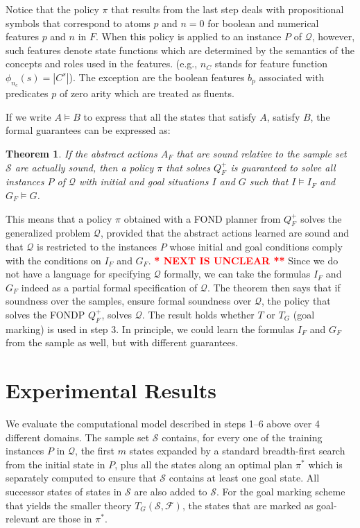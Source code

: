 \documentclass[letterpaper]{article} %
\newtheorem{theorem}[definition]{Theorem}
\newcommand{\Q}{\mathcal{Q}}
\newcommand{\F}{\mathcal{F}}
\renewcommand{\S}{\mathcal{S}}
\begin{document}
Notice that the policy $\pi$ that results from the last step deals with
propositional symbols that correspond to atoms $p$ and $n=0$ for boolean
and numerical features $p$ and $n$ in $F$.
When this policy is applied to an instance $P$ of $\Q$, however, such features denote state functions
which are determined by the  semantics of the concepts and roles used in  the features.
(e.g., $n_C$ stands for feature function $\phi_{n_c}(s)=|C^s|$).
The exception are the boolean features $b_p$ associated with
predicates $p$ of zero arity which are treated as fluents.

If we write $A \vDash B$ to express that all the states that satisfy $A$, satisfy $B$, 
the formal guarantees can be expressed as:

\begin{theorem}
If the abstract actions $A_F$ that are sound relative to the sample set $\S$  are actually sound,
then a   policy $\pi$ that solves  $Q^+_F$  is guaranteed to solve  all instances $P$ of $\Q$
with initial and goal situations $I$ and $G$ such that $I \vDash  I_F$ and $G_F \vDash G$.
\end{theorem}

This means that a policy $\pi$ obtained with a FOND planner from $Q^+_F$ 
solves the generalized problem $\Q$, provided that the abstract actions
learned are sound and that $\Q$ is restricted to the instances $P$ whose
initial and goal conditions comply with the conditions on $I_F$ and $G_F$.
\textcolor{red}{\bf ** NEXT IS UNCLEAR **}
Since we do not have a language for specifying $\Q$ formally, we can take
the formulas $I_F$ and $G_F$ indeed as a partial formal specification of
$\Q$. The theorem then says that if soundness over the samples, ensure
formal soundness over $\Q$, the policy that solves the FONDP $Q^+_F$,
solves $\Q$. The result holds whether $T$ or $T_G$ (goal marking) is used in step 3.
In principle, we could learn the formulas $I_F$ and $G_F$ from the sample as well,  but with different guarantees. 

\section{Experimental Results}

We evaluate the computational model described in steps 1--6 above over 4 different domains.
%
The sample set $\S$
contains, for every one of the training instances $P$ in $\Q$,
the first $m$  states expanded by a standard breadth-first search from the initial state in $P$,
plus all the states along an optimal plan $\pi^*$ which is separately computed to ensure that $\S$ 
contains at least one goal state. 
All successor states of states in $\S$ are also added to $\S$.
%
For the goal marking scheme that yields the smaller theory $T_G(\S, \F)$, the states that are marked as
goal-relevant are those in $\pi^*$.
\end{document}
